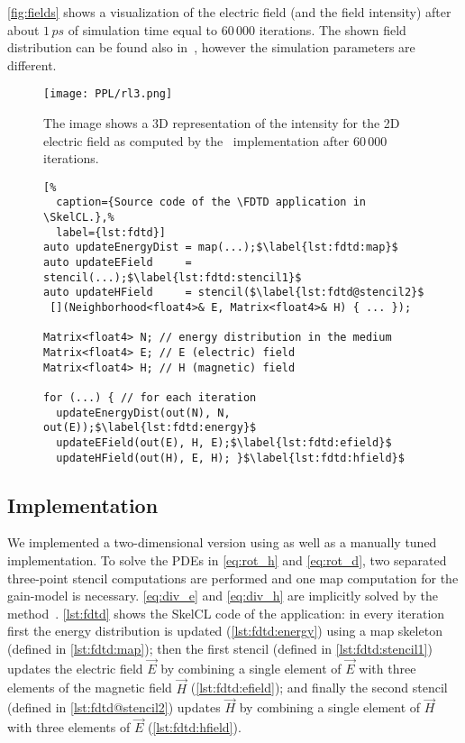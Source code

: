 \autoref{fig:fields} shows a visualization of the electric field (and the field intensity) after about  $1\,ps$ of simulation time equal to $60\,000$ iterations.
The shown field distribution can be found also in~\cite{Sebbah2002, Yamilov2005}, however the simulation parameters are different.

\begin{figure}[t]
    \centering
    \texttt{[image: PPL/rl3.png]}
    \caption[A 3D representation of the inensity of the 2D electric field as computed by the \SkelCL\ \FDTD implementation.]%
            {\small The image shows a 3D representation of the intensity for the 2D electric field as computed by the \SkelCL\ \FDTD implementation after $60\,000$ iterations.}
    \label{fig:fields}
\end{figure}

\begin{figure}[tbp]
\begin{lstlisting}[%
  caption={Source code of the \FDTD application in \SkelCL.},%
  label={lst:fdtd}]
auto updateEnergyDist = map(...);$\label{lst:fdtd:map}$
auto updateEField     = stencil(...);$\label{lst:fdtd:stencil1}$
auto updateHField     = stencil($\label{lst:fdtd@stencil2}$
 [](Neighborhood<float4>& E, Matrix<float4>& H) { ... });

Matrix<float4> N; // energy distribution in the medium
Matrix<float4> E; // E (electric) field
Matrix<float4> H; // H (magnetic) field

for (...) { // for each iteration
  updateEnergyDist(out(N), N, out(E));$\label{lst:fdtd:energy}$
  updateEField(out(E), H, E);$\label{lst:fdtd:efield}$
  updateHField(out(H), E, H); }$\label{lst:fdtd:hfield}$
\end{lstlisting}
\end{figure}

\subsection*{\SkelCL Implementation}

We implemented a two-dimensional version using \SkelCL as well as a manually tuned \OpenCL implementation.
To solve the PDEs in \autoref{eq:rot_h} and \autoref{eq:rot_d}, two separated three-point stencil computations are performed and one map computation for the gain-model is necessary.
\autoref{eq:div_e} and \autoref{eq:div_h} are implicitly solved by the \FDTD method~\cite{Yee1966}.
\autoref{lst:fdtd} shows the SkelCL code of the application:
in every iteration first the energy distribution is updated (\autoref{lst:fdtd:energy}) using a map skeleton (defined in \autoref{lst:fdtd:map});
then the first stencil (defined in \autoref{lst:fdtd:stencil1}) updates the electric field $\vec{E}$ by combining a single element of $\vec{E}$ with three elements of the magnetic field $\vec{H}$ (\autoref{lst:fdtd:efield});
and finally the second stencil (defined in \autoref{lst:fdtd@stencil2}) updates $\vec{H}$ by combining a single element of $\vec{H}$ with three elements of $\vec{E}$ (\autoref{lst:fdtd:hfield}).

